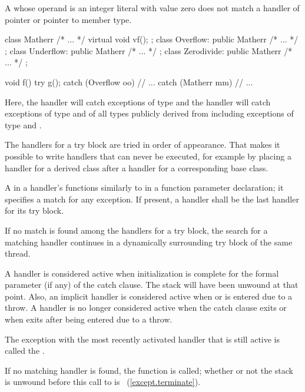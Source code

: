 \enternote
A
whose operand is an integer literal with value zero does not match a handler of
pointer or pointer to member type.
\exitnote

\enterexample
\begin{codeblock}
class Matherr { /* ... */ virtual void vf(); };
class Overflow: public Matherr { /* ... */ };
class Underflow: public Matherr { /* ... */ };
class Zerodivide: public Matherr { /* ... */ };

void f() {
  try {
    g();
  } catch (Overflow oo) {
        // ...
  } catch (Matherr mm) {
        // ...
  }
}
\end{codeblock}
Here, the
handler will catch exceptions of type
and the
handler will catch exceptions of type
and of all types publicly derived from
including exceptions of type
and
.
\exitexample

\pnum
The handlers for a try block are tried in order of appearance.
That makes it possible to write handlers that can never be
executed, for example by placing a handler for a derived class after
a handler for a corresponding base class.

\pnum
A
in a handler's
functions similarly to
in a function parameter declaration;
it specifies a match for any exception.
If present, a
handler shall be the last handler for its try block.

\pnum
If no match is found among the handlers for a try block,
the search for a matching
handler continues in a dynamically surrounding try block
of the same thread.

\pnum
A handler is considered active when initialization is complete for
the formal parameter (if any) of the catch clause.
\enternote
The stack will have been unwound at that point.
\exitnote
Also, an implicit handler is considered active when
or
is entered due to a throw. A handler is no longer considered active when the
catch clause exits or when
exits after being entered due to a throw.

\pnum
The exception with the most recently activated handler that is
still active is called the
.

\pnum
If no matching handler is found,
the function
is called;
whether or not the stack is unwound before this call to
is ~(\ref{except.terminate}).

